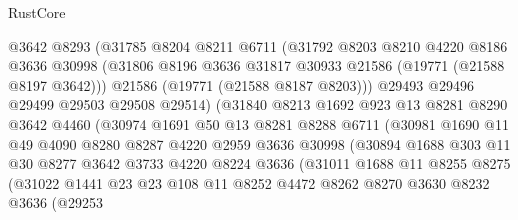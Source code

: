 \begin{lexlean}{RustCore}
\begin{coremodule}
                    @3642
                    @8293
                    (@31785
                      @8204
                      @8211
                      @6711
                      (@31792
                        @8203
                        @8210
                        @4220
                        @8186
                        @3636
                        @30998
                        (@31806 @8196 @3636 @31817 @30933 @21586 (@19771 (@21588 @8197 @3642)))
                        @21586
                        (@19771 (@21588 @8187 @8203)))
                      @29493
                      @29496
                      @29499
                      @29503
                      @29508
                      @29514)
                    (@31840
                      @8213
                      @1692
                      @923
                      @13
                      @8281
                      @8290
                      @3642
                      @4460
                      (@30974
                        @1691
                        @50
                        @13
                        @8281
                        @8288
                        @6711
                        (@30981
                          @1690
                          @11
                          @49
                          @4090
                          @8280
                          @8287
                          @4220
                          @2959
                          @3636
                          @30998
                          (@30894
                            @1688
                            @303
                            @11
                            @30
                            @8277
                            @3642
                            @3733
                            @4220
                            @8224
                            @3636
                            (@31011
                              @1688
                              @11
                              @8255
                              @8275
                              (@31022
                                @1441
                                @23
                                @23
                                @108
                                @11
                                @8252
                                @4472
                                @8262
                                @8270
                                @3630
                                @8232
                                @3636
                                (@29253

\end{coremodule}
\end{lexlean}
